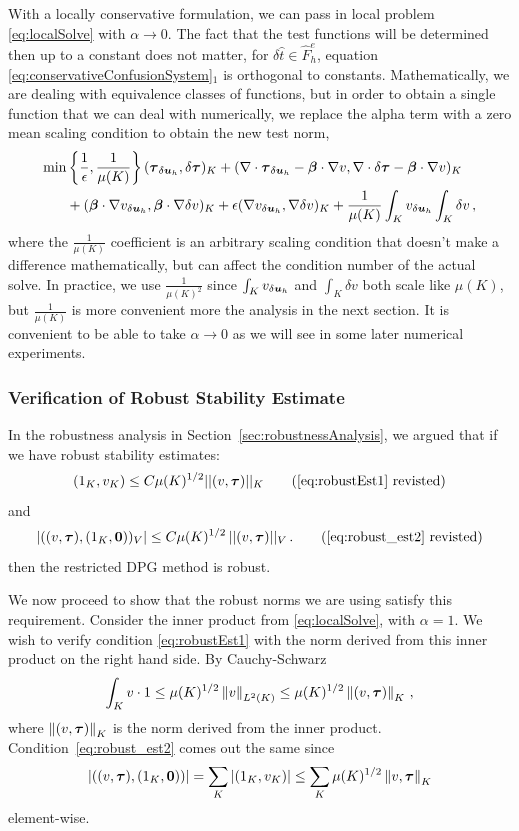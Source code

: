 \documentclass[Proposal.tex]{subfiles}
\begin{document}
With a locally conservative formulation, we can pass in local problem
\eqref{eq:localSolve} with $\alpha\rightarrow0$. The fact that the test
functions will be determined then up to a constant does not matter, for
$\delta\hat t\in\hat F_h^e$, equation
\eqref{eq:conservativeConfusionSystem}$_1$ is orthogonal to constants.
Mathematically, we are dealing with equivalence classes of functions, but in
order to obtain a single function that we can deal with numerically, we
replace the alpha term with a zero mean scaling condition to obtain the new
test norm,
\begin{align}
\label{eq:localSolveMod}
\min&\left\{\frac{1}{\epsilon},\frac{1}{\mu(K)}\right\}(\boldsymbol\tau_{\delta\boldsymbol{u}_h},\delta\boldsymbol\tau)_K
+(\nabla\cdot\boldsymbol\tau_{\delta\boldsymbol{u}_h}-\boldsymbol\beta\cdot\nabla
v,\nabla\cdot\delta\boldsymbol\tau-\boldsymbol\beta\cdot\nabla v)_K\\
&+(\boldsymbol\beta\cdot\nabla v_{\delta\boldsymbol{u}_h},\boldsymbol\beta\cdot\nabla \delta v)_K\nonumber
+\epsilon(\nabla v_{\delta\boldsymbol{u}_h},\nabla \delta v)_K
+\frac{1}{\mu(K)}\int_Kv_{\delta\boldsymbol{u}_h}\int_K\delta v\,,
\end{align}
where the $\frac{1}{\mu(K)}$ coefficient is an arbitrary scaling condition
that doesn't make a difference mathematically, but can affect the condition
number of the actual solve. In practice, we use $\frac{1}{\mu(K)^2}$
since $\int_Kv_{\delta\boldsymbol{u}_h}$ and $\int_K\delta v$ both scale like
$\mu(K)$, but $\frac{1}{\mu(K)}$ is more convenient more the analysis in the
next section.
It is convenient to be able to take $\alpha\rightarrow0$ as we will see in
some later numerical experiments.

\subsubsection{Verification of Robust Stability Estimate}
In the robustness analysis in Section~\ref{sec:robustnessAnalysis}, we argued
that if we have robust stability estimates:
\begin{equation}
(1_K, v_K) \leq C \mu(K)^{1/2} || (v,\bftau) ||_K
\tag{\ref{eq:robustEst1} revisted}
\end{equation}
and
\begin{equation}
| ((v,\bftau),(1_K,{\bf 0}))_V | \leq C \mu(K)^{1/2} \, || (v,\bftau) ||_V\,.
\tag{\ref{eq:robust_est2} revisted}
\end{equation}
then the restricted DPG method is robust.

We now proceed to show that the robust norms we are using satisfy this
requirement.
Consider the inner product from \eqref{eq:localSolve}, with
$\alpha=1$. We wish to
verify condition \eqref{eq:robustEst1} with the norm derived from this inner
product on the right hand side. By Cauchy-Schwarz
\begin{equation}
   \int_K v\cdot
   1\leq\mu(K)^{1/2}\left\| v \right\|_{L^2(K)}\leq\mu(K)^{1/2}\left\| (v,\boldsymbol\tau) \right\|_K\,,
   \label{eq:robustProof}
\end{equation}
where $\left\| (v,\boldsymbol\tau) \right\|_K$ is the norm derived from the inner product.
Condition~\eqref{eq:robust_est2} comes out the same since
$$|(
(v,\boldsymbol\tau),(1_K,{\bf0}))| =
\sum_K|(1_K,v_K)|\leq\sum_K\mu(K)^{1/2}\left\| v,\boldsymbol\tau \right\|_K
$$
element-wise.
\end{document}
